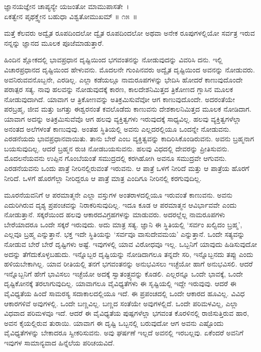 \begin{shloka}
ಜ್ಞಾನಯಜ್ಞೇನ ಚಾಪ್ಯನ್ಯೇ ಯಜಂತೋ ಮಾಮುಪಾಸತೇ~।\\ಏಕತ್ವೇನ ಪೃಥಕ್ತ್ವೇನ ಬಹುಧಾ ವಿಶ್ವತೋಮುಖಮ್ \hfill॥ ೧೫~॥
\end{shloka}

\begin{artha}
ಮತ್ತೆ ಕೆಲವರು ಅದ್ವೈತ ರೂಪದಿಂದಲೋ ದ್ವೈತ ರೂಪದಿಂದಲೋ ಅಥವಾ ಅನೇಕ ರೂಪು\-ಗಳಲ್ಲಿಯೋ ಸರ್ವತ್ರ ಇರುವ ನನ್ನನ್ನು ಜ್ಞಾನದ ಮೂಲಕ ಪೂಜೆಮಾಡುತ್ತಾರೆ.
\end{artha}

ಹಿಂದಿನ ಶ್ಲೋಕದಲ್ಲಿ ಭಾವಪ್ರಧಾನ ದೃಷ್ಟಿಯಿಂದ ಭಗವಂತನನ್ನು ನೋಡುವುದನ್ನು ವಿವರಿಸಿ ದನು. ಇಲ್ಲಿ ವಿಚಾರಪ್ರಧಾನದ ದೃಷ್ಟಿಯಿಂದ ಹೇಳುವನು. ಮೊದಲನೇ ಗುಂಪಿನವರು ಅದ್ವೈತ ದೃಷ್ಟಿಯಿಂದ ಅವನನ್ನು ನೋಡುವರು. ಅವನಿರುವವನೊಬ್ಬನೇ, ಎರಡಿಲ್ಲ. ಎಲ್ಲಾ ಕಡೆಯಲ್ಲೂ ನಾಮರೂಪಗಳನ್ನು ಭೇದಿಸಿ ಹೋದರೆ ಕಾಣುವುದೊಂದೇ ಪರಾತ್ಪರ ಸತ್ಯ. ನಾವು ಹಲವನ್ನು ನೋಡುವುದಕ್ಕೆ ಕಾರಣ, ಕಾಲದೇಶನಿಮಿತ್ತದ ತ್ರಿಕೋಣದ ಗ್ಲಾಸಿನ ಮೂಲಕ ನೋಡುವುದಾಗಿದೆ. ಯಾವಾಗ ಆ ತ್ರಿಕೋಣವನ್ನು ಅತಿಕ್ರಮಿಸುವೆವೋ ಆಗ ಕಾಣುವುದೊಂದೇ. ಅದರಂತೆಯೇ ಪರಬ್ರಹ್ಮ, ಜೀವ ಮತ್ತು ಜಗತ್ತು ಈಶ್ವರನಂತೆ ಕವಲೊಡೆದು ಕಾಣುವನು ದೇಶಕಾಲನಿಮಿತ್ತದ ಮೂಲಕ ನೋಡಿದಾಗ. ಯಾವಾಗ ಅದನ್ನು ಅತಿಕ್ರಮಿಸುವೆವೊ ಆಗ ಹಲವು ವ್ಯಕ್ತಿತ್ವಗಳು ಇರುವುದಕ್ಕೆ ಸಾಧ್ಯವಿಲ್ಲ. ಹಲವು ವ್ಯಕ್ತಿತ್ವಗಳೆಲ್ಲಾ ಅನಂತದ ಅಲೆಗಳಂತೆ ಕಾಣುವುವು. ಅಂತಹ ಸ್ಥಿತಿಯಲ್ಲಿ ಅವನು ಎಲ್ಲದರಲ್ಲಿಯೂ ಒಂದನ್ನೇ ನೋಡುವನು. ಎರಡನೆಯದು ಭಾವಪ್ರಧಾನವಾಯಿತು. ತಾನು ಬೇರೆ ಎಂಬ ವ್ಯಕ್ತಿತ್ವವನ್ನು ಕಾದಿರಿಸಿಕೊಂಡಿರುವನು. ಅವನು ಬ್ರಹ್ಮನಾಗ ಬಯಸುವುದಿಲ್ಲ. ಆದರೆ ಬ್ರಹ್ಮನ ರುಚಿ ನೋಡಬಯಸುವನು. ಹಲವು ವಿಧದಲ್ಲಿ ದೇವರನ್ನು ಪ್ರೀತಿಸುವನು. ಮೊದಲನೆಯವನು ಉಪ್ಪಿನ ಗೊಂಬೆಯಂತೆ ಸಮುದ್ರದಲ್ಲಿ ಕರಗಿಹೋಗಿ ಅವನೂ ಸಮುದ್ರವೇ ಆಗುವನು. ಎರಡನೆಯವನು ಒಂದು ಪಾತ್ರೆ ನೀರಿನಲ್ಲಿರುವಂತೆ ಇರುವನು. ಆ ಪಾತ್ರೆ ಒಳಗೆ ನೀರಿದೆ ಮತ್ತು ಆ ಪಾತ್ರೆಯ ಹೊರಗೆ ನೀರಿದೆ. ಒಳಗೆ ಹೊರಗೆಲ್ಲಾ ನೀರಿದ್ದರೂ ಆ ಪಾತ್ರೆ ಮಾತ್ರ ಎಂದಿಗೂ ನೀರಿನಲ್ಲಿ ಕರಗುವುದಿಲ್ಲ.

ಮೂರನೆಯವನಿಗೆ ಆ ಪರಮಾತ್ಮನೇ ಎಲ್ಲಾ ವಸ್ತುಗಳ ಅಂತರಾಳದಲ್ಲಿಯೂ ಇರುವಂತೆ ಕಾಣುವನು. ಅವನು ಎದುರಿಗಿರುವ ದೃಶ್ಯ ಪ್ರಪಂಚವನ್ನು ನಿರಾಕರಿಸುವುದಿಲ್ಲ. ಇದೂ ಕೂಡ ಆ ಪರಮಾತ್ಮನ ಆವಿರ್ಭಾವವೇ ಎಂದು ನೋಡುತ್ತಾನೆ. ಸಕ್ಕರೆಯಿಂದ ಹಲವು ಆಕಾರದ\break ವಿಗ್ರಹಗಳನ್ನು ಮಾಡುವರು. ಅದರಲ್ಲೆಲ್ಲ ನಾಮರೂಪಗಳು ಬೇರೆಯಾದರೂ ಒಂದೇ ಸಕ್ಕರೆ ಇರುವುದು. ಅದು ಮಾತ್ರ ಸತ್ಯ. ಜ್ಞಾನಿ ಈ ಸ್ಥಿತಿಯಲ್ಲಿ ‘ಸರ್ವಂ ಖಲ್ವಿದಂ ಬ್ರಹ್ಮ’, ಎಲ್ಲವೂ ಬ್ರಹ್ಮ ಎನ್ನುತ್ತಾನೆ. ಭಕ್ತ ಇದೇ ಸ್ಥಿತಿಯನ್ನು ‘ಸರ್ವವೂ ವಾಸುದೇವಮಯ’ ಎನ್ನುತ್ತಾನೆ. ಒಂದೇ ಸತ್ಯವನ್ನು ನೋಡುವ ಬೇರೆ ಬೇರೆ ದೃಷ್ಟಿಗಳು ಅಷ್ಟೆ. ಇವುಗಳಲ್ಲಿ ಯಾವ ವಿರೋಧವೂ ಇಲ್ಲ. ಒಬ್ಬನಿಗೆ ಯಾವುದು ಹಿಡಿಸುವುದೋ ಅದನ್ನು ತೆಗೆದುಕೊಳ್ಳಬಹುದು. ಇನ್ನೊಬ್ಬರ ದೃಷ್ಟಿಯನ್ನು ನೋಡಿದಾಗಲೂ ತನ್ನದೇ ಸರಿ, ಇನ್ನೊಬ್ಬನದು ತಪ್ಪು ಎಂದು ಹಳಿಯಬೇಕಾಗಿಲ್ಲ. ಯಾವ ರೀತಿಯಲ್ಲಿ ತನಗೆ ಭಗವಂತನನ್ನು ಅನುಭವಿಸಲು ಇಚ್ಛೆಯೋ ಹಾಗೆ ಅನುಭವಿಸಲಿ. ಆದರೆ ಇನ್ನೊಬ್ಬನಿಗೆ ಹೇಗೆ ಭಾವಿಸಲು ಇಚ್ಛೆಯೋ ಅದಕ್ಕೆ ಸ್ವಾತಂತ್ರ್ಯವನ್ನು ಕೊಡಲಿ. ಎಲ್ಲರನ್ನೂ ಒಂದೇ ಭಾವಕ್ಕೆ, ಒಂದೇ ದೃಷ್ಟಿಕೋನಕ್ಕೆ ತರಲಾಗುವುದಿಲ್ಲ. ಯಾವಾಗಲೂ ವೈವಿಧ್ಯತೆಗಳು ಈ ಸೃಷ್ಟಿಯಲ್ಲಿ ಇದ್ದೇ ಇರುವುವು. ಆದರೆ ಈ ವೈವಿಧ್ಯತೆಯ ಹಿಂದೆ ಸಾಮರಸ್ಯ ಸದಾಕಾಲದಲ್ಲಿಯೂ ಇದೆ. ಈ ಪ್ರಪಂಚದಲ್ಲಿ ಒಂದೇ ಆಕಾರದ ಹೂವಿಲ್ಲ. ವಿವಿಧ ಆಕಾರಗಳಿವೆ ಅವುಗಳಲ್ಲಿ. ಒಂದೇ ಬಣ್ಣವಿಲ್ಲ. ಬಣ್ಣದ ಸಂತೆಯೇ ಅವುಗಳಲ್ಲಿದೆ. ಒಂದೇ ಪರಿಮಳವಿಲ್ಲ, ಎಲ್ಲಾ ವಿಧವಾದ ಪರಿಮಳವೂ ಇದೆ. ಆದರೆ ಈ ವೈವಿಧ್ಯತೆಯ ಪುಷ್ಪಗಳೆಲ್ಲಾ ಭಗವಂತ ಕೊರಳಿನಲ್ಲಿ ರಾಜಿಸುತ್ತಿರುವ ಹಾರ, ಅವನ ಕೈಯಲ್ಲಿರುವ ತುರಾಯಿ. ಯಾವಾಗ ಈ ದೃಷ್ಟಿ ಒಬ್ಬನಲ್ಲಿ ಬರುವುದೋ ಆಗ ಅವನು ಎಷ್ಟೊಂದು ವೈವಿಧ್ಯತೆಗಳನ್ನು ಬೇಕಾದರೂ ಸ್ವೀಕರಿಸುವನು. ಅವು ಘರ್ಷಣೆ ಇಲ್ಲದೆ ಅವನಲ್ಲಿ ಇರಬಲ್ಲವು. ಏಕೆಂದರೆ ಅವನಿಗೆ ಇವುಗಳ ಸಾಮಾನ್ಯವಾದ ಹಿನ್ನೆಲೆಯ ಪರಿಚಯವಿದೆ.

